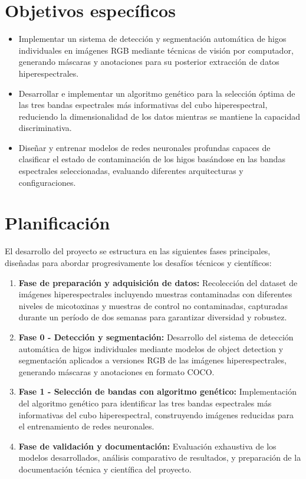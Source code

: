 \section{Objetivos específicos}
\begin{itemize}
    \item Implementar un sistema de detección y segmentación automática de higos individuales en imágenes RGB mediante técnicas de visión por computador, generando máscaras y anotaciones para su posterior extracción de datos hiperespectrales.
    \item Desarrollar e implementar un algoritmo genético para la selección óptima de las tres bandas espectrales más informativas del cubo hiperespectral, reduciendo la dimensionalidad de los datos mientras se mantiene la capacidad discriminativa.
    \item Diseñar y entrenar modelos de redes neuronales profundas capaces de clasificar el estado de contaminación de los higos basándose en las bandas espectrales seleccionadas, evaluando diferentes arquitecturas y configuraciones.
\end{itemize}

\newpage
\section{Planificación}
El desarrollo del proyecto se estructura en las siguientes fases principales, diseñadas para abordar progresivamente los desafíos técnicos y científicos:

\begin{enumerate}
    \item \textbf{Fase de preparación y adquisición de datos:} Recolección del dataset de imágenes hiperespectrales incluyendo muestras contaminadas con diferentes niveles de micotoxinas y muestras de control no contaminadas, capturadas durante un período de dos semanas para garantizar diversidad y robustez.
    \item \textbf{Fase 0 - Detección y segmentación:} Desarrollo del sistema de detección automática de higos individuales mediante modelos de object detection y segmentación aplicados a versiones RGB de las imágenes hiperespectrales, generando máscaras y anotaciones en formato COCO.
    \item \textbf{Fase 1 - Selección de bandas con algoritmo genético:} Implementación del algoritmo genético para identificar las tres bandas espectrales más informativas del cubo hiperespectral, construyendo imágenes reducidas para el entrenamiento de redes neuronales.
    \item \textbf{Fase de validación y documentación:} Evaluación exhaustiva de los modelos desarrollados, análisis comparativo de resultados, y preparación de la documentación técnica y científica del proyecto.
\end{enumerate}

